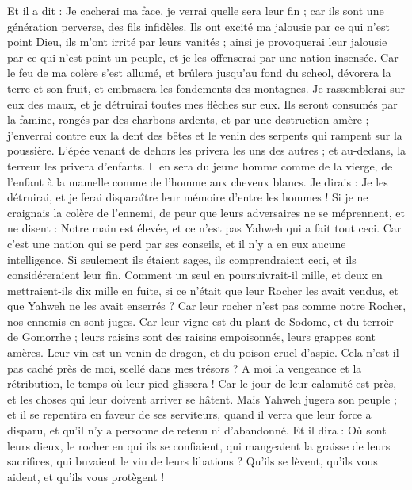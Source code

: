 \begin{multicols}{2}
Et il a dit : Je cacherai ma face, je verrai quelle sera leur fin ; car ils sont une génération perverse, des fils infidèles.
Ils ont excité ma jalousie par ce qui n'est point Dieu, ils m'ont irrité par leurs vanités ; ainsi je provoquerai leur jalousie par ce qui n'est point un peuple, et je les offenserai par une nation insensée.
Car le feu de ma colère s'est allumé, et brûlera jusqu'au fond du scheol, dévorera la terre et son fruit, et embrasera les fondements des montagnes.
Je rassemblerai sur eux des maux, et je détruirai toutes mes flèches sur eux.
Ils seront consumés par la famine, rongés par des charbons ardents, et par une destruction amère ; j'enverrai contre eux la dent des bêtes et le venin des serpents qui rampent sur la poussière.
L'épée venant de dehors les privera les uns des autres ; et au-dedans, la terreur les privera d'enfants. Il en sera du jeune homme comme de la vierge, de l'enfant à la mamelle comme de l'homme aux cheveux blancs.
Je dirais : Je les détruirai, et je ferai disparaître leur mémoire d'entre les hommes !
Si je ne craignais la colère de l'ennemi, de peur que leurs adversaires ne se méprennent, et ne disent : Notre main est élevée, et ce n'est pas Yahweh qui a fait tout ceci.
Car c'est une nation qui se perd par ses conseils, et il n'y a en eux aucune intelligence.
Si seulement ils étaient sages, ils comprendraient ceci, et ils considéreraient leur fin.
Comment un seul en poursuivrait-il mille, et deux en mettraient-ils dix mille en fuite, si ce n'était que leur Rocher les avait vendus, et que Yahweh ne les avait enserrés ?
Car leur rocher n'est pas comme notre Rocher, nos ennemis en sont juges.
Car leur vigne est du plant de Sodome, et du terroir de Gomorrhe ; leurs raisins sont des raisins empoisonnés, leurs grappes sont amères.
Leur vin est un venin de dragon, et du poison cruel d'aspic.
Cela n'est-il pas caché près de moi, scellé dans mes trésors ?
A moi la vengeance et la rétribution, le temps où leur pied glissera ! Car le jour de leur calamité est près, et les choses qui leur doivent arriver se hâtent.
Mais Yahweh jugera son peuple ; et il se repentira en faveur de ses serviteurs, quand il verra que leur force a disparu, et qu'il n'y a personne de retenu ni d'abandonné.
Et il dira : Où sont leurs dieux, le rocher en qui ils se confiaient,
qui mangeaient la graisse de leurs sacrifices, qui buvaient le vin de leurs libations ? Qu'ils se lèvent, qu'ils vous aident, et qu'ils vous protègent !

\end{multicols}
